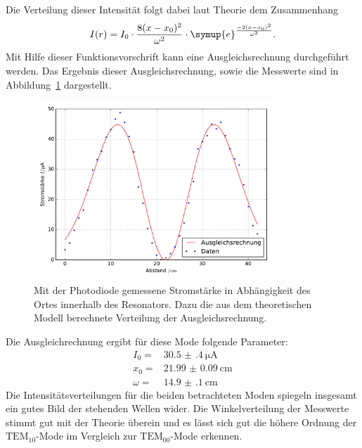 %
Die Verteilung dieser Intensität folgt dabei laut Theorie dem Zusammenhang
%
\begin{equation}
  I(r)=I_0\cdot\frac{8(x-x_0)^2}{\omega^2}\cdot\symup{e}^{\frac{-2(x-x_0)^2}{\omega^2}}.
\end{equation}
%
Mit Hilfe dieser Funktionsvorschrift kann eine Ausgleichsrechnung durchgeführt werden. Das Ergebnis dieser Ausgleichsrechnung, sowie die Messwerte sind in Abbildung~\ref{fig:tem10} dargestellt.
%
\begin{figure}[h]
  \centering
  \includegraphics[width=0.8\textwidth]{auswertung/plot_Mode10.pdf}
  \caption{Mit der Photodiode gemessene Stromstärke in Abhängigkeit des Ortes innerhalb des Resonators. Dazu die aus dem theoretischen Modell berechnete Verteilung der Ausgleichsrechnung.}
  \label{fig:tem10}
\end{figure}
%
Die Ausgleichrechnung ergibt für diese Mode folgende Parameter:
%
\begin{align*}
  I_0=&\SI{30.5(4)}{\micro\ampere} \\
  x_0=&\SI{21.99(9)}{\centi\meter} \\
  \omega=&\SI{14.9(1)}{\centi\meter}
\end{align*}
%
Die Intensitätsverteilungen für die beiden betrachteten Moden spiegeln insgesamt ein gutes Bild der stehenden Wellen wider. Die Winkelverteilung
der Messwerte stimmt gut mit der Theorie überein und es lässt sich gut die höhere Ordnung der $\text{TEM}_{10}$-Mode im Vergleich zur $\text{TEM}_{00}$-Mode erkennen.

%
